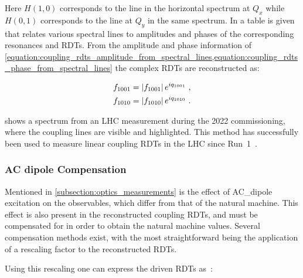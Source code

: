Here \(H(1,0)\) corresponds to the line in the horizontal spectrum at \(Q_x\) while \(H(0, 1)\) corresponds to the line at \(Q_y\) in the same spectrum.
In \cite{PRAB:Franchi:First_Simultaneous} a table is given that relates various spectral lines to amplitudes and phases of the corresponding resonances and RDTs.
From the amplitude and phase information of \cref{equation:coupling_rdts_amplitude_from_spectral_lines,equation:coupling_rdts_phase_from_spectral_lines} the complex RDTs are reconstructed as:

\begin{equation}
  \begin{aligned}
    f_{1001} &= \left\lvert f_{1001} \right\rvert e^{i q_{1001}}  \text{ ,}  \\
    f_{1010} &= \left\lvert f_{1010} \right\rvert e^{i q_{1010}}  \text{ .}  \\
  \end{aligned}
  \label{equation:complex_coupling_rdts_from_phase_and_amplitude}
\end{equation}

 shows a spectrum from an LHC measurement during the \num{2022} commissioning, where the coupling lines are visible and highlighted.
This method has successfully been used to measure linear coupling RDTs in the LHC since Run~\num{1}~\cite{PRAB:Benedikt:Driving_Term_Experiments_CERN,IPAC:Persson:Automatic_Coupling_Correction_LHC_Injection_Oscillations,IPAC:Miyamoto:Measurement_Coupling_RDTs_LHC_AC_Dipole}.

\subsubsection*{AC dipole Compensation}

Mentioned in \cref{subsection:optics_measurements} is the effect of \gls{AC_dipole} excitation on the observables, which differ from that of the natural machine.
This effect is also present in the reconstructed coupling \glspl{RDT}, and must be compensated for in order to obtain the natural machine values.
Several compensation methods exist, with the most straightforward being the application of a rescaling factor to the reconstructed \glspl{RDT}.

Using this rescaling one can express the driven \glspl{RDT} as~\cite{IPAC:Wegscheider:Forced_Coupling_Resonance_Driving_Terms}:

